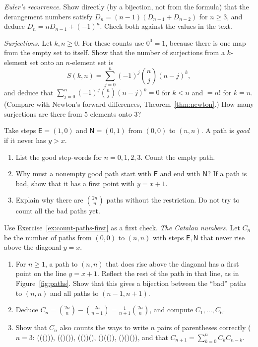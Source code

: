 \begin{exercise}[$\star\star$]\label{ex:derangrec}
\emph{Euler's recurrence.} Show directly (by a bijection, not from the formula) that the derangement numbers satisfy $D_n=(n-1)(D_{n-1}+D_{n-2})$ for $n\ge3$, and deduce $D_n=nD_{n-1}+(-1)^n$. Check both against the values in the text.
\end{exercise}

\begin{exercise}[$\star\star$]\label{ex:surj}
\emph{Surjections.} Let $k,n\ge0$. For these counts use $0^0=1$, because there is one map from the empty set to itself. Show that the number of surjections from a $k$-element set onto an $n$-element set is
\[
S(k,n)=\sum_{j=0}^n(-1)^j\binom nj(n-j)^k ,
\]
and deduce that $\sum_{j=0}^n(-1)^j\binom nj(n-j)^k=0$ for $k<n$ and $=n!$ for $k=n$. (Compare with Newton's forward differences, Theorem~\ref{thm:newton}.) How many surjections are there from $5$ elements onto $3$?
\end{exercise}

\begin{exercise}[$\star$]\label{ex:count-paths-first}
Take steps $\mathsf E=(1,0)$ and $\mathsf N=(0,1)$ from $(0,0)$ to
$(n,n)$. A path is \emph{good} if it never has $y>x$.
\begin{enumerate}[label=(\alph*)]
\item List the good step-words for $n=0,1,2,3$. Count the empty path.
\item Why must a nonempty good path start with $\mathsf E$ and end
with $\mathsf N$? If a path is bad, show that it has a first point
with $y=x+1$.
\item Explain why there are $\binom{2n}n$ paths without the restriction.
Do not try to count all the bad paths yet.
\end{enumerate}
\end{exercise}

\begin{exercise}[$\star\star\star$]\label{ex:catalan}
Use Exercise~\ref{ex:count-paths-first} as a first check.
\emph{The Catalan numbers.} Let $C_n$ be the number of paths from $(0,0)$ to $(n,n)$ with steps $\mathsf E,\mathsf N$ that never rise above the diagonal $y=x$.
\begin{enumerate}[label=(\alph*)]
\item For $n\ge1$, a path to $(n,n)$ that does rise above the diagonal has a first point on the line $y=x+1$. Reflect the rest of the path in that line, as in Figure~\ref{fig:paths}. Show that this gives a bijection between the ``bad'' paths to $(n,n)$ and all paths to $(n-1,n+1)$.
\item Deduce $C_n=\binom{2n}n-\binom{2n}{n-1}=\frac1{n+1}\binom{2n}n$, and compute $C_1,\dots,C_6$.
\item Show that $C_n$ also counts the ways to write $n$ pairs of parentheses correctly ($n=3$: ((())), (()()), (())(), ()(()), ()()()), and that $C_{n+1}=\sum_{k=0}^nC_kC_{n-k}$.
\end{enumerate}
\end{exercise}

